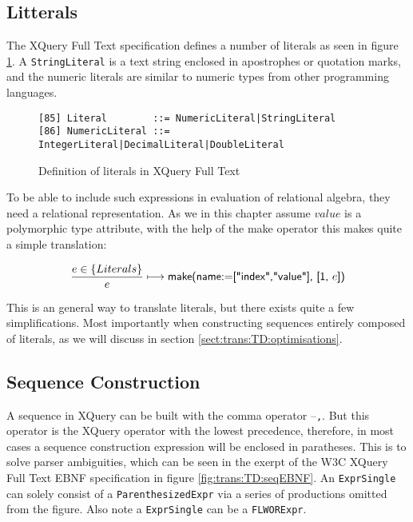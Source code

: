 \subsection{Litterals}
\label{sect:trans:TD:litteral}

The XQuery Full Text specification\cite{w3c01} defines a number of literals as seen in figure
\ref{fig:trans:TD:litEBNF}. A \texttt{StringLiteral} is a text string enclosed in apostrophes or quotation marks,
and the numeric literals are similar to numeric types from other programming languages. 

\begin{figure}[h]
\begin{Verbatim}
[85] Literal        ::= NumericLiteral|StringLiteral
[86] NumericLiteral ::= IntegerLiteral|DecimalLiteral|DoubleLiteral
\end{Verbatim}
\caption[Literals in XQuery]{Definition of literals in XQuery Full Text}
\label{fig:trans:TD:litEBNF}
\end{figure}

To be able to include such expressions in evaluation of relational algebra, they need a relational representation.
As we in this chapter assume $value$ is a polymorphic type attribute, with the help of the \textsf{make} operator
this makes quite a simple translation:

\begin{equation}
\frac{e \in \left\{Literals\right\}}{e}\longmapsto
\mbox{\textsf{make(name:=["index","value"], [1, }}e\mbox{\textsf{])}}
\label{rule:trans:TD:literal}
\end{equation}

This is an general way to translate literals, but there exists quite a few simplifications. Most importantly when
constructing sequences entirely composed of literals, as we will discuss in section
\ref{sect:trans:TD:optimisations}.

\subsection{Sequence Construction}
\label{sect:trans:TD:seqBuild}

A sequence in XQuery can be built with the comma operator --\texttt{,}. But this operator is the XQuery operator
with the lowest precedence, therefore, in most cases a sequence construction expression will be enclosed in
paratheses. This is to solve parser ambiguities, which can be seen in the exerpt of the W3C XQuery Full Text EBNF
specification\cite{w3c01} in figure \ref{fig:trans:TD:seqEBNF}. An \texttt{ExprSingle} can solely consist of a
\texttt{ParenthesizedExpr} via a series of productions omitted from the figure. Also note a \texttt{ExprSingle}
can be a \texttt{FLWORExpr}.

